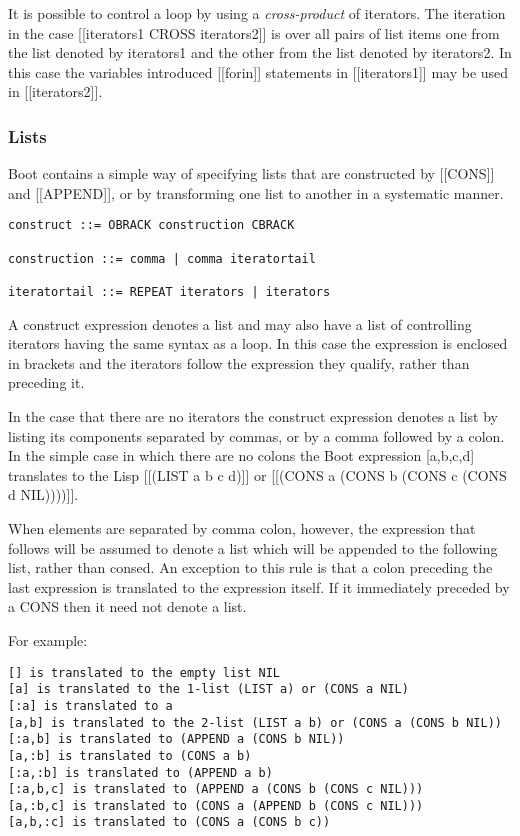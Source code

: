 \documentclass{article}
\begin{document}
It is possible to control a loop by using a \emph{cross-product} of iterators.
The iteration in the case [[iterators1 CROSS iterators2]] is over
all pairs of list items one from the list denoted by
iterators1 and the other from the list denoted by iterators2.
In this case the variables introduced [[forin]] statements in 
[[iterators1]] may be used in [[iterators2]].
 
\subsubsection{Lists}
\label{sec:boot:list}
 
Boot contains a simple way of specifying lists that are constructed
by [[CONS]] and [[APPEND]], or by transforming one list to another in a
systematic manner.
\begin{verbatim}  
construct ::= OBRACK construction CBRACK
 
construction ::= comma | comma iteratortail
 
iteratortail ::= REPEAT iterators | iterators
\end{verbatim} 

A construct expression denotes a list and may also have a list
of controlling iterators having the same syntax as a loop. In this
case the expression is enclosed in brackets and the iterators follow
the expression they qualify, rather than preceding it.
 
In the case that there are no iterators the construct expression
denotes a list by listing its components separated by commas, or by
a comma followed by a colon. In the simple case in which there are no
colons the Boot expression [a,b,c,d] translates to the Lisp
[[(LIST a b c d)]] or [[(CONS a (CONS b (CONS c (CONS d NIL))))]].
 
When elements are separated by comma colon, however, the expression
that follows will be assumed to denote a list which will be appended
to the following list, rather than consed. An exception to this rule
is that a colon preceding the last expression is translated to
the expression itself. If it immediately preceded by a CONS
then it need not denote a list.
 
For example:
\begin{verbatim} 
[] is translated to the empty list NIL
[a] is translated to the 1-list (LIST a) or (CONS a NIL)
[:a] is translated to a
[a,b] is translated to the 2-list (LIST a b) or (CONS a (CONS b NIL))
[:a,b] is translated to (APPEND a (CONS b NIL))
[a,:b] is translated to (CONS a b)
[:a,:b] is translated to (APPEND a b)
[:a,b,c] is translated to (APPEND a (CONS b (CONS c NIL)))
[a,:b,c] is translated to (CONS a (APPEND b (CONS c NIL)))
[a,b,:c] is translated to (CONS a (CONS b c))
\end{verbatim} 
\end{document}
